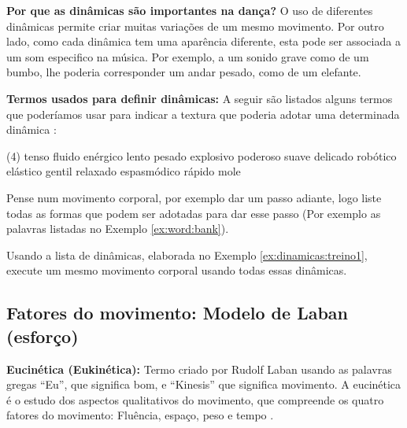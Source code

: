 \begin{tcbinformation} 
\label{ref:importanciadinamicas}
\textbf{Por que as dinâmicas são importantes na dança?}
O uso de diferentes dinâmicas permite criar muitas variações de um mesmo movimento.
Por outro lado, como cada dinâmica tem uma aparência diferente,
esta pode ser associada a um som especifico na música.
Por exemplo, a um sonido grave como de um bumbo,
lhe poderia corresponder um andar pesado, como de um elefante.
\end{tcbinformation} 

\begin{example}
\label{ex:word:bank}
\textbf{Termos usados para definir dinâmicas:} 
A seguir são listados alguns termos que poderíamos usar 
para indicar a textura que poderia adotar uma determinada dinâmica \cite[pp. 31]{paine2014complete}:

\begin{tasks}(4)
\task tenso
\task fluido
\task enérgico
\task lento
\task pesado
\task explosivo
\task poderoso
\task suave
\task delicado
\task robótico
\task elástico
\task gentil
\task relaxado
\task espasmódico
\task rápido
\task mole
\end{tasks}
\end{example}


\begin{example}
\label{ex:dinamicas:treino1}
Pense num movimento corporal, por exemplo dar um passo adiante,
logo liste todas as formas que podem ser adotadas para dar esse passo (Por 
exemplo as palavras listadas no Exemplo \ref{ex:word:bank}). 
\end{example}

\begin{example}
\label{ex:dinamicas:treino2}
Usando a lista de dinâmicas, elaborada no Exemplo \ref{ex:dinamicas:treino1},
execute um mesmo movimento corporal usando  todas essas dinâmicas.
\end{example}


\subsection{Fatores do movimento: Modelo de Laban (esforço)}
\label{subsec:fatordinamica}

\begin{tcbinformation} 
\label{ref:eukinetic}
\textbf{Eucinética (Eukinética):}
Termo criado por Rudolf Laban usando as palavras gregas ``Eu'', que significa bom,
e ``Kinesis'' que significa movimento.
A eucinética é o estudo dos aspectos qualitativos do movimento,
que compreende os quatro fatores do movimento: Fluência,  espaço,  peso  e  tempo 
\cite[pp. 25-26]{elementosdanca2017} \cite[pp. 97]{maletic2011body}.
\end{tcbinformation} 


